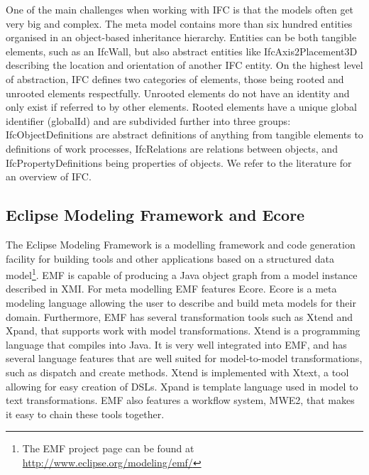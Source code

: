 One of the main challenges when working with IFC is that the models often get very big and complex. The meta model contains more than six hundred entities organised in an object-based inheritance hierarchy. Entities can be both tangible elements, such as an IfcWall, but also abstract entities like IfcAxis2Placement3D describing the location and orientation of another IFC entity. On the highest level of abstraction, IFC defines two categories of elements, those being rooted and unrooted elements respectfully. Unrooted elements do not have an identity and only exist if referred to by other elements. Rooted elements have a unique global identifier (globalId) and are subdivided further into three groups: IfcObjectDefinitions are abstract definitions of anything from tangible elements to definitions of work processes, IfcRelations are relations between objects, and IfcPropertyDefinitions being properties of objects. We refer to the literature for an overview of IFC.

\subsection{Eclipse Modeling Framework and Ecore}
The Eclipse Modeling Framework is a modelling framework and code generation facility for building tools and other applications based on a structured data model\footnote{The EMF project page can be found at \url{http://www.eclipse.org/modeling/emf/}}. EMF is capable of producing a Java object graph from a model instance described in XMI. For meta modelling EMF features Ecore. Ecore is a meta modeling language allowing the user to describe and build meta models for their domain. Furthermore, EMF has several transformation tools such as Xtend and Xpand, that supports work with model transformations. Xtend is a programming language that compiles into Java. It is very well integrated into EMF, and has several language features that are well suited for model-to-model transformations, such as dispatch and create methods. Xtend is implemented with Xtext, a tool allowing for easy creation of DSLs. Xpand is template language used in model to text transformations. EMF also features a workflow system, MWE2, that makes it easy to chain these tools together.
